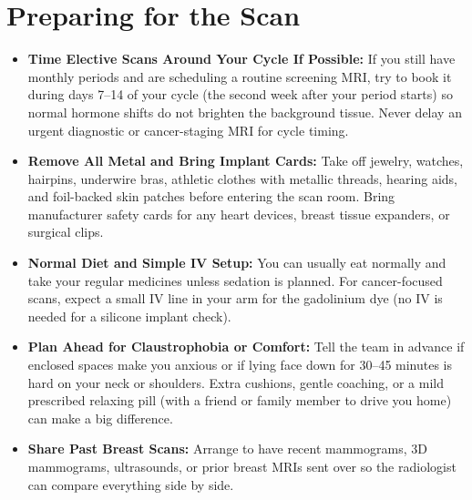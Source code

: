 \section{Preparing for the Scan}
\begin{itemize}
\item \textbf{Time Elective Scans Around Your Cycle If Possible:} If you still have monthly periods and are scheduling a routine screening MRI, try to book it during days 7--14 of your cycle (the second week after your period starts) so normal hormone shifts do not brighten the background tissue. Never delay an urgent diagnostic or cancer-staging MRI for cycle timing.
\item \textbf{Remove All Metal and Bring Implant Cards:} Take off jewelry, watches, hairpins, underwire bras, athletic clothes with metallic threads, hearing aids, and foil-backed skin patches before entering the scan room. Bring manufacturer safety cards for any heart devices, breast tissue expanders, or surgical clips.
\item \textbf{Normal Diet and Simple IV Setup:} You can usually eat normally and take your regular medicines unless sedation is planned. For cancer-focused scans, expect a small IV line in your arm for the gadolinium dye (no IV is needed for a silicone implant check).
\item \textbf{Plan Ahead for Claustrophobia or Comfort:} Tell the team in advance if enclosed spaces make you anxious or if lying face down for 30--45 minutes is hard on your neck or shoulders. Extra cushions, gentle coaching, or a mild prescribed relaxing pill (with a friend or family member to drive you home) can make a big difference.
\item \textbf{Share Past Breast Scans:} Arrange to have recent mammograms, 3D mammograms, ultrasounds, or prior breast MRIs sent over so the radiologist can compare everything side by side.
\end{itemize}

